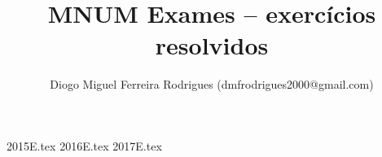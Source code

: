 \documentclass{mnum}
\title{MNUM Exames -- exercícios resolvidos}
\author{Diogo Miguel Ferreira Rodrigues (dmfrodrigues2000@gmail.com)}
\date{}
\begin{document}
\maketitle

\tableofcontents

{2015E.tex}
{2016E.tex}
{2017E.tex}
\end{document}
